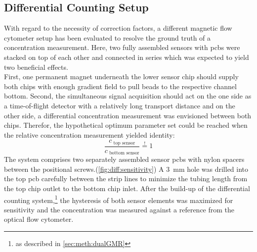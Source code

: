 \subsection{Differential Counting Setup}
\label{sec:res:diffCounting}
With regard to the necessity of correction factors, a different magnetic flow cytometer setup has been evaluated to resolve the ground truth of a concentration measurement. Here, two fully assembled sensors with \glspl{pcb} were stacked on top of each other and connected in series which was expected to yield two beneficial effects.\\
First, one permanent magnet underneath the lower sensor chip should supply both chips with enough gradient field to pull beads to the respective channel bottom. Second, the simultaneous signal acquisition should act on the one side as a time-of-flight detector with a relatively long transport distance and on the other side, a differential concentration measurement was envisioned between both chips. Therefor, the hypothetical optimum parameter set could be reached when the relative concentration measurement yielded identity:
\begin{equation}
	\dfrac{c_\text{\ top sensor}}{c_\text{\ bottom\ sensor}} \overset{!}{=} 1
	\label{eq:diff:optimum}
\end{equation}
The system comprises two separately assembled sensor \glspl{pcb} with nylon spacers between the positional screws.(\cref{fig:diff:sensitivity})  A \SI{3}{\milli\meter} hole was drilled into the top \gls{pcb} carefully between the strip lines to minimize the tubing length from the top chip outlet to the bottom chip inlet. 
After the build-up of the differential counting system,\footnote{as described in \cref{sec:meth:dualGMR}} the hysteresis of both sensor elements was maximized for sensitivity and the concentration was measured against a reference from the optical flow cytometer. 
